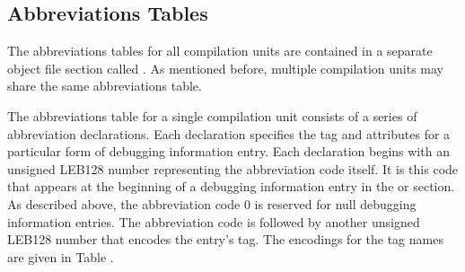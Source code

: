 \subsection{Abbreviations Tables}
\label{datarep:abbreviationstables}

The abbreviations tables for all compilation units
are contained in a separate object file section called
\dotdebugabbrev{}.
As mentioned before, multiple compilation
units may share the same abbreviations table.

The abbreviations table for a single compilation unit consists
of a series of abbreviation declarations. Each declaration
specifies the tag and attributes for a particular form of
debugging information entry. Each declaration begins with
an unsigned LEB128 number representing the abbreviation
code itself. It is this code that appears at the beginning
of a debugging information entry in the 
\dotdebuginfo{} or
\dotdebugtypes{}
section. As described above, the abbreviation
code 0 is reserved for null debugging information entries. The
abbreviation code is followed by another unsigned LEB128
number that encodes the entry\textquoteright s tag. The encodings for the
tag names are given in 
Table .

